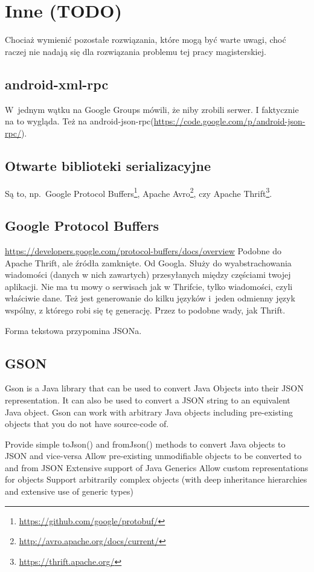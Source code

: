 \section{Inne (TODO)}
Chociaż wymienić pozostałe rozwiązania, które mogą być warte uwagi, choć raczej nie nadają się dla rozwiązania problemu tej pracy magisterskiej.

\subsection{android-xml-rpc}
W~jednym wątku na Google Groups \cite{android-rpc-thread} mówili, że niby zrobili serwer. I faktycznie na to wygląda.
Też na android-json-rpc(\url{https://code.google.com/p/android-json-rpc/}).


\subsection{Otwarte biblioteki serializacyjne}
Są to, np.\ Google Protocol Buffers\footnote{\url{https://github.com/google/protobuf/}}, Apache Avro\footnote{\url{http://avro.apache.org/docs/current/}}, czy Apache Thrift\footnote{\url{https://thrift.apache.org/}}.


\subsection{Google Protocol Buffers}
\url{https://developers.google.com/protocol-buffers/docs/overview}
Podobne do Apache Thrift, ale źródła zamknięte. Od Googla. Służy do wyabstrachowania wiadomości (danych w nich zawartych) przesyłanych między częściami twojej aplikacji.
Nie ma tu mowy o serwisach jak w Thrifcie, tylko wiadomości, czyli właściwie dane.
Też jest generowanie do kilku języków i~jeden odmienny język wspólny, z którego robi się tę generację. Przez to podobne wady, jak Thrift.

Forma tekstowa przypomina JSONa.


\subsection{GSON}
Gson is a Java library that can be used to convert Java Objects into their JSON representation. It can also be used to convert a JSON string to an equivalent Java object. Gson can work with arbitrary Java objects including pre-existing objects that you do not have source-code of.

Provide simple toJson() and fromJson() methods to convert Java objects to JSON and vice-versa
Allow pre-existing unmodifiable objects to be converted to and from JSON
Extensive support of Java Generics
Allow custom representations for objects
Support arbitrarily complex objects (with deep inheritance hierarchies and extensive use of generic types)

